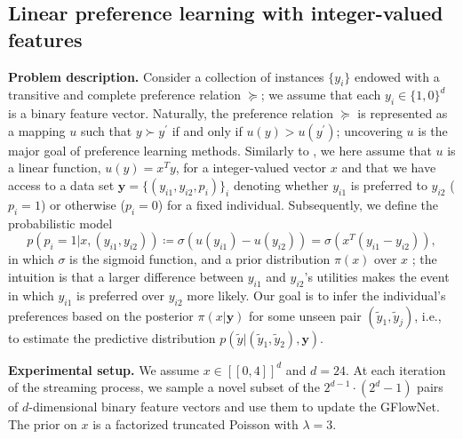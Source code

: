 \documentclass{article}
\newcommand{\pp}[1]{\vspace{0pt}\noindent\textbf{#1}}
\theoremstyle{plain}
\theoremstyle{definition}
\theoremstyle{remark}
\theoremstyle{remark}
\begin{document}
\subsection{Linear preference learning with integer-valued features} \label{sec:exp:p} 
\renewcommand{\pp}[1]{\noindent\textbf{#1}}

\pp{Problem description.} Consider a collection of instances $\{y_{i}\}$ endowed with a transitive and complete preference relation  $\succeq$; we assume that each $y_{i} \in \{1, 0\}^{d}$ is a binary feature vector. Naturally, the preference relation $\succeq$ is represented as a mapping $u$ such that $y \succ y^{\prime}$ if and only if $u(y) > u(y^{\prime})$; uncovering $u$ is the major goal of preference learning methods. Similarly to \cite{Cole1993, Hornberger1995}, we here assume that $u$ is a linear function, $u(y) = x^{T}y$, for a integer-valued vector $x$ and that we have access to a data set $\mathbf{y} = \{(y_{i1}, y_{i2}, p_{i})\}_{i}$ denoting whether $y_{i1}$ is preferred to $y_{i2}$ ($p_{i} = 1$) or otherwise ($p_{i} = 0$) for a fixed individual. Subsequently, we define the probabilistic model 
\begin{equation}
    p(p_{i} = 1 | x, (y_{i1}, y_{i2})) \coloneqq \sigma(u(y_{i1}) - u(y_{i2})) = \sigma\left(x^T (y_{i1} - y_{i2})\right), 
\end{equation}
in which $\sigma$ is the sigmoid function, and a prior distribution $\pi(x)$ over $x$ \cite{gonzalez2017preferential}; the intuition is that a larger difference between $y_{i1}$ and $y_{i2}$'s utilities makes the event in which $y_{i1}$ is preferred over $y_{i2}$ more likely. Our goal is to infer the individual's preferences based on the posterior $\pi(x | \mathbf{y})$ for some unseen pair $(\tilde{y}_{1}, \tilde{y}_{j})$, i.e., to estimate the predictive distribution $p(\tilde{y} | (\tilde{y}_{1}, \tilde{y}_{2}), \mathbf{y})$.  

\pp{Experimental setup.} We assume $x \in [[0, 4]]^{d}$ and $d = 24$. At each iteration of the streaming process, we sample a novel subset of the $2^{d - 1} \cdot (2^{d} - 1)$ pairs of $d$-dimensional binary feature vectors and use them to update the GFlowNet. The prior on $x$ is a factorized truncated Poisson with $\lambda = 3$. 
\end{document}
